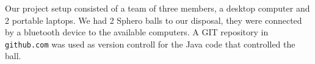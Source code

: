 Our project setup consisted of a team of three members, a desktop computer and 2 portable laptops. We had 2 Sphero balls to our disposal, they were connected by a bluetooth device to the available computers. A GIT repository in \texttt{github.com} was used as version controll for the Java code that controlled the ball.

